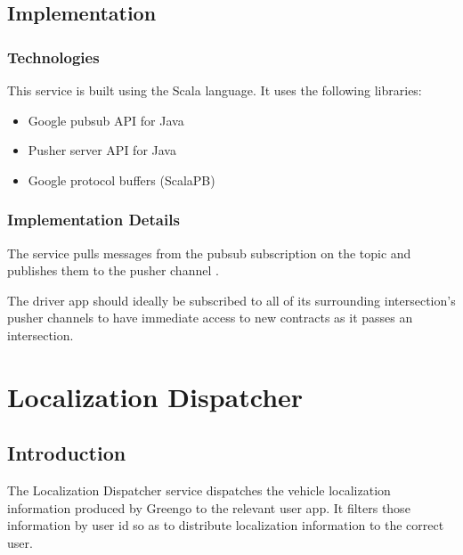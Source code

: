 \documentclass[letterpaper,10pt,english]{sphinxmanual}
\begin{document}
\subsection{Implementation}
\label{\detokenize{microservices/contract_dispatcher/implementation:implementation}}\label{\detokenize{microservices/contract_dispatcher/implementation::doc}}

\subsubsection{Technologies}
\label{\detokenize{microservices/contract_dispatcher/implementation:technologies}}
This service is built using the Scala language.
It uses the following libraries:
\begin{itemize}
\item {} 
Google pubsub API for Java

\item {} 
Pusher server API for Java

\item {} 
Google protocol buffers (ScalaPB)

\end{itemize}


\subsubsection{Implementation Details}
\label{\detokenize{microservices/contract_dispatcher/implementation:implementation-details}}
The service pulls messages from the pubsub subscription  on the topic  and publishes them to the pusher channel .

The driver app should ideally be subscribed to all of its surrounding intersection’s pusher channels to have immediate access to new contracts as it passes an intersection.


\section{Localization Dispatcher}
\label{\detokenize{microservices/localization_dispatcher/index:localization-dispatcher}}\label{\detokenize{microservices/localization_dispatcher/index::doc}}

\subsection{Introduction}
\label{\detokenize{microservices/localization_dispatcher/introduction:introduction}}\label{\detokenize{microservices/localization_dispatcher/introduction::doc}}
The Localization Dispatcher service dispatches the vehicle localization information produced by Greengo to the relevant user app.
It filters those information by user id so as to distribute localization information to the correct user.
\end{document}
